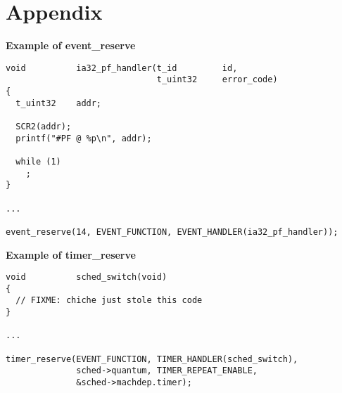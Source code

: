 %
%

\newpage

\section{Appendix}

\textbf{Example of event\_reserve}

\begin{verbatim}
void          ia32_pf_handler(t_id         id,
                              t_uint32     error_code)
{
  t_uint32    addr;

  SCR2(addr);
  printf("#PF @ %p\n", addr);

  while (1)
    ;
}

...

event_reserve(14, EVENT_FUNCTION, EVENT_HANDLER(ia32_pf_handler));
\end{verbatim}

\textbf{Example of timer\_reserve}

\begin{verbatim}
void          sched_switch(void)
{
  // FIXME: chiche just stole this code
}

...

timer_reserve(EVENT_FUNCTION, TIMER_HANDLER(sched_switch),
              sched->quantum, TIMER_REPEAT_ENABLE,
              &sched->machdep.timer);
\end{verbatim}
